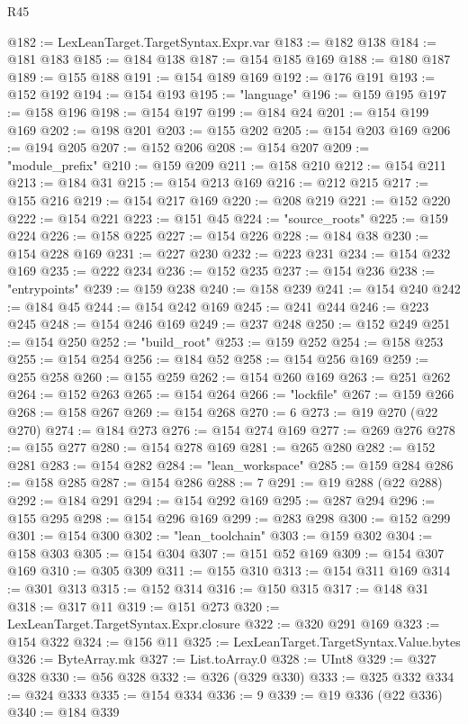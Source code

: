 \begin{lexlean}{R45}
\begin{coremodule}
@182 := LexLeanTarget.TargetSyntax.Expr.var
@183 := @182 @138
@184 := @181 @183
@185 := @184 @138
@187 := @154 @185 @169
@188 := @180 @187
@189 := @155 @188
@191 := @154 @189 @169
@192 := @176 @191
@193 := @152 @192
@194 := @154 @193
@195 := "language"
@196 := @159 @195
@197 := @158 @196
@198 := @154 @197
@199 := @184 @24
@201 := @154 @199 @169
@202 := @198 @201
@203 := @155 @202
@205 := @154 @203 @169
@206 := @194 @205
@207 := @152 @206
@208 := @154 @207
@209 := "module_prefix"
@210 := @159 @209
@211 := @158 @210
@212 := @154 @211
@213 := @184 @31
@215 := @154 @213 @169
@216 := @212 @215
@217 := @155 @216
@219 := @154 @217 @169
@220 := @208 @219
@221 := @152 @220
@222 := @154 @221
@223 := @151 @45
@224 := "source_roots"
@225 := @159 @224
@226 := @158 @225
@227 := @154 @226
@228 := @184 @38
@230 := @154 @228 @169
@231 := @227 @230
@232 := @223 @231
@234 := @154 @232 @169
@235 := @222 @234
@236 := @152 @235
@237 := @154 @236
@238 := "entrypoints"
@239 := @159 @238
@240 := @158 @239
@241 := @154 @240
@242 := @184 @45
@244 := @154 @242 @169
@245 := @241 @244
@246 := @223 @245
@248 := @154 @246 @169
@249 := @237 @248
@250 := @152 @249
@251 := @154 @250
@252 := "build_root"
@253 := @159 @252
@254 := @158 @253
@255 := @154 @254
@256 := @184 @52
@258 := @154 @256 @169
@259 := @255 @258
@260 := @155 @259
@262 := @154 @260 @169
@263 := @251 @262
@264 := @152 @263
@265 := @154 @264
@266 := "lockfile"
@267 := @159 @266
@268 := @158 @267
@269 := @154 @268
@270 := 6
@273 := @19 @270 (@22 @270)
@274 := @184 @273
@276 := @154 @274 @169
@277 := @269 @276
@278 := @155 @277
@280 := @154 @278 @169
@281 := @265 @280
@282 := @152 @281
@283 := @154 @282
@284 := "lean_workspace"
@285 := @159 @284
@286 := @158 @285
@287 := @154 @286
@288 := 7
@291 := @19 @288 (@22 @288)
@292 := @184 @291
@294 := @154 @292 @169
@295 := @287 @294
@296 := @155 @295
@298 := @154 @296 @169
@299 := @283 @298
@300 := @152 @299
@301 := @154 @300
@302 := "lean_toolchain"
@303 := @159 @302
@304 := @158 @303
@305 := @154 @304
@307 := @151 @52 @169
@309 := @154 @307 @169
@310 := @305 @309
@311 := @155 @310
@313 := @154 @311 @169
@314 := @301 @313
@315 := @152 @314
@316 := @150 @315
@317 := @148 @31
@318 := @317 @11
@319 := @151 @273
@320 := LexLeanTarget.TargetSyntax.Expr.closure
@322 := @320 @291 @169
@323 := @154 @322
@324 := @156 @11
@325 := LexLeanTarget.TargetSyntax.Value.bytes
@326 := ByteArray.mk
@327 := List.toArray.{0}
@328 := UInt8
@329 := @327 @328
@330 := @56 @328
@332 := @326 (@329 @330)
@333 := @325 @332
@334 := @324 @333
@335 := @154 @334
@336 := 9
@339 := @19 @336 (@22 @336)
@340 := @184 @339

\end{coremodule}
\end{lexlean}
